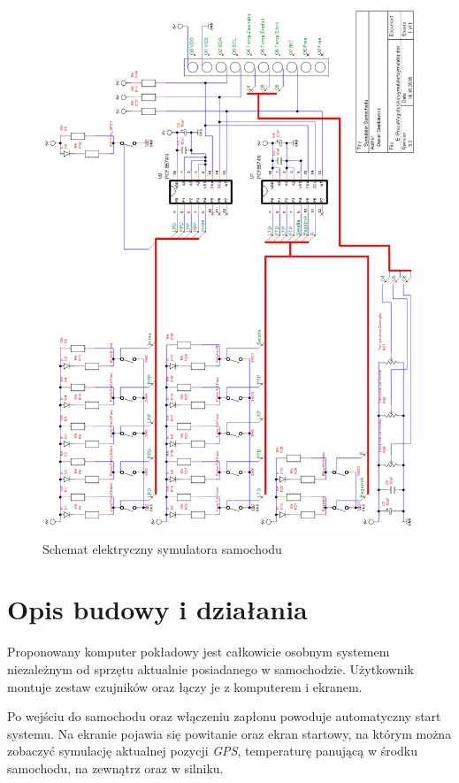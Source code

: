 \documentclass{xmgr}
\begin{document}
\begin{figure}[!hp]
    \centering
    	\includegraphics[height=0.9\textheight]{images/symulator.png}
    \caption{Schemat elektryczny symulatora samochodu}
\end{figure}

\section{Opis budowy i działania}
Proponowany komputer pokładowy jest całkowicie osobnym systemem niezależnym od sprzętu aktualnie posiadanego w samochodzie. Użytkownik montuje zestaw czujników oraz łączy je z komputerem i ekranem. 

Po wejściu do samochodu oraz włączeniu zapłonu powoduje automatyczny start systemu. Na ekranie pojawia się powitanie oraz ekran startowy, na którym można zobaczyć symulację aktualnej pozycji \emph{GPS}, temperaturę panującą w środku samochodu, na zewnątrz oraz w silniku. 
\end{document}
